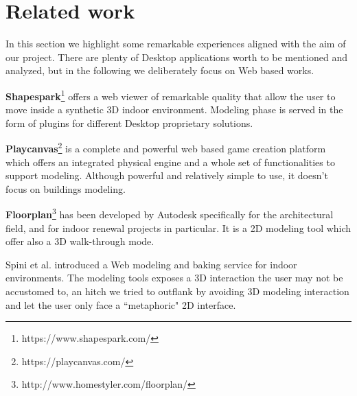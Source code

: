 \section{Related work}\label{sec:related_work}

In this section we highlight some remarkable experiences aligned with the aim of our project. There are plenty of Desktop applications worth to be mentioned and analyzed, but in the following we deliberately focus on Web based works. 

\textbf{Shapespark}\footnote{https://www.shapespark.com/} offers a web viewer of remarkable quality that allow the user to move inside a synthetic 3D indoor environment. Modeling phase is served in the form of plugins for different Desktop proprietary solutions.

\textbf{Playcanvas}\footnote{https://playcanvas.com/} is a complete and powerful web based game creation platform which offers an integrated physical engine and a whole set of functionalities to support modeling. Although powerful and relatively simple to use, it doesn't focus on buildings modeling.

\textbf{Floorplan}\footnote{http://www.homestyler.com/floorplan/} has been developed by Autodesk specifically for the architectural field, and for indoor renewal projects in particular. It is a 2D modeling tool which offer also a 3D walk-through mode.

Spini et al. \cite{Spini:2016:WIA:2945292.2945309} introduced a Web modeling and baking service for indoor environments. The modeling tools exposes a 3D interaction the user may not be accustomed to, an hitch we tried to outflank by avoiding 3D modeling interaction and let the user only face a ``metaphoric" 2D interface.